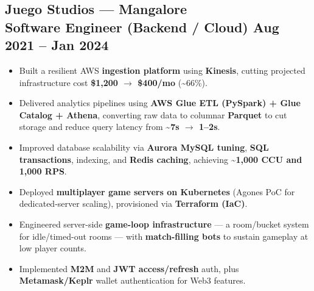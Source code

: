 \documentclass[a4paper,10pt]{article}
\begin{document}
\begin{minipage}[t]{0.60\textwidth}
\subsection*{{\color{accent}Juego Studios --- Mangalore}\\ \textnormal{Software Engineer (Backend / Cloud)} \textbar{} Aug 2021 -- Jan 2024}
\begin{itemize}
  \item Built a resilient AWS \textbf{ingestion platform} using \textbf{Kinesis}, cutting projected infrastructure cost \textbf{\$1,200 $\rightarrow$ \$400/mo} (\textasciitilde{}66\%).
  \item Delivered analytics pipelines using \textbf{AWS Glue ETL (PySpark) + Glue Catalog + Athena}, converting raw data to columnar \textbf{Parquet} to cut storage and reduce query latency from \textbf{\textasciitilde{}7s $\rightarrow$ 1--2s}.
  \item Improved database scalability via \textbf{Aurora MySQL tuning}, \textbf{SQL transactions}, indexing, and \textbf{Redis caching}, achieving \textbf{\textasciitilde{}1,000 CCU and 1,000 RPS}.
  \item Deployed \textbf{multiplayer game servers on Kubernetes} (Agones PoC for dedicated-server scaling), provisioned via \textbf{Terraform (IaC)}.
  \item Engineered server-side \textbf{game-loop infrastructure} --- a room/bucket system for idle/timed-out rooms --- with \textbf{match-filling bots} to sustain gameplay at low player counts.
  \item Implemented \textbf{M2M} and \textbf{JWT access/refresh} auth, plus \textbf{Metamask/Keplr} wallet authentication for Web3 features.
\end{itemize}

\end{minipage}%
\hfill%
\end{document}
